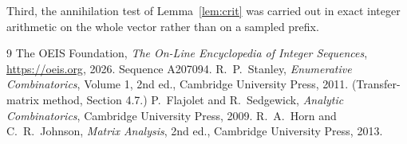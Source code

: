 \documentclass[11pt,a4paper]{article}
\theoremstyle{plain}
\theoremstyle{definition}
\begin{document}
Third, the annihilation test of Lemma~\ref{lem:crit} was carried out in exact integer
arithmetic on the whole vector rather than on a sampled prefix.

\begin{thebibliography}{9}
 The OEIS Foundation, \emph{The On-Line Encyclopedia of Integer
Sequences}, \url{https://oeis.org}, 2026. Sequence A207094.
 R.~P.~Stanley, \emph{Enumerative Combinatorics}, Volume 1, 2nd ed.,
Cambridge University Press, 2011. (Transfer-matrix method, Section 4.7.)
 P.~Flajolet and R.~Sedgewick, \emph{Analytic Combinatorics}, Cambridge
University Press, 2009.
 R.~A.~Horn and C.~R.~Johnson, \emph{Matrix Analysis}, 2nd ed., Cambridge
University Press, 2013.
\end{thebibliography}
\end{document}
